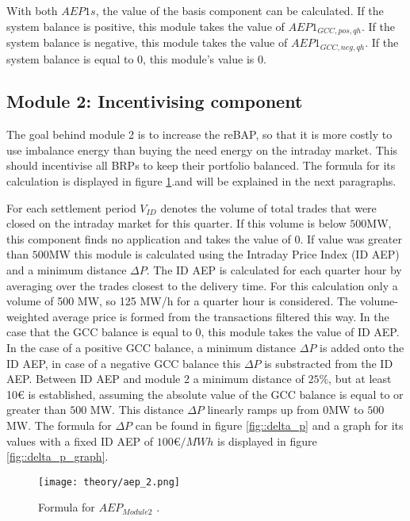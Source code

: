 \documentclass[class=scrbook, crop=false]{standalone}
\begin{document}
With both $AEP1s$, the value of the basis component can be calculated. If the system balance is positive, this module takes the value of $AEP1_{GCC, pos, qh}$. If the system balance is negative, this module takes the value of $AEP1_{GCC, neg, qh}$. If the system balance is equal to 0, this module's value is 0.

\subsection{Module 2: Incentivising component}
\label{Section::Module_2}
The goal behind module 2 is to increase the reBAP, so that it is more costly to use imbalance energy than buying the need energy on the intraday market. This should incentivise all BRPs to keep their portfolio balanced. 
The formula for its calculation is displayed in figure \ref{fig::aep2}.and will be explained in the next paragraphs.

For each settlement period $V_{ID}$ denotes the volume of total trades that were closed on the intraday market for this quarter. If this volume is below $500$MW, this component finds no application and takes the value of 0. If value was greater than $500$MW this module is calculated using the Intraday Price Index (ID AEP) and a minimum distance $\Delta P$. 
The ID AEP is calculated for each quarter hour by averaging over the trades closest to the delivery time. For this calculation only a volume of 500 MW, so 125 MW/h for a quarter hour is considered.  
The volume-weighted average price is formed from the transactions filtered this way. 
In the case that the GCC balance is equal to 0, this module takes the value of ID AEP.  In the case of a positive GCC balance, a minimum distance $\Delta P$ is added onto the ID AEP, in case of a negative GCC balance this $\Delta P$ is substracted from the ID AEP. Between ID AEP and module 2 a minimum distance of $25\%$, but at least 10€ is established, assuming the absolute value of the GCC balance is equal to or greater than $500$ MW. This distance $\Delta P$ linearly ramps up from $0$MW to $500$MW. The formula for $\Delta P$ can be found in figure \ref{fig::delta_p} and a graph for its values with a fixed ID AEP of $100€/MWh$ is displayed in figure \ref{fig::delta_p_graph}.

 \begin{figure}[ht]
            \centering
            \texttt{[image: theory/aep\_2.png]}
             \caption[Formula for $AEP_{Module 2}$]{Formula for $AEP_{Module 2}$ \cite{NetztransparenzReBAP}.}
            \label{fig::aep2}
 \end{figure}
\end{document}
